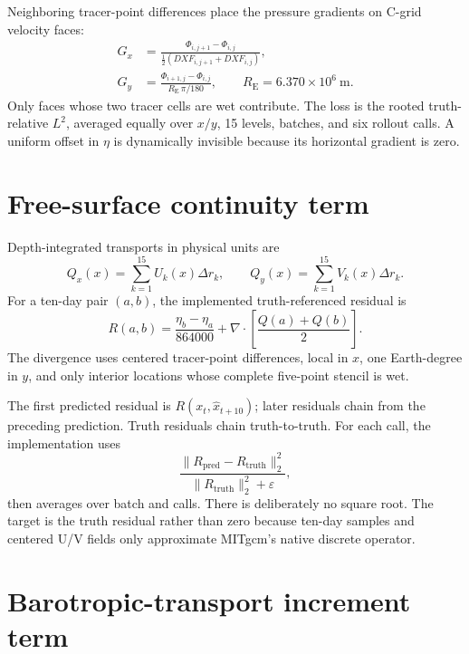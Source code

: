 \documentclass[11pt,oneside]{report}
\newcommand{\code}[1]{\texttt{\detokenize{#1}}}
\newcommand{\Ltwo}{L^2}
\newcommand{\eps}{\varepsilon}
\begin{document}
Neighboring tracer-point differences place the pressure gradients on C-grid
velocity faces:
\begin{align}
  G_x &= \frac{\Phi_{i,j+1}-\Phi_{i,j}}
              {\tfrac12(DXF_{i,j+1}+DXF_{i,j})},\\
  G_y &= \frac{\Phi_{i+1,j}-\Phi_{i,j}}
              {R_{\mathrm E}\,\pi/180},
  \qquad R_{\mathrm E}=6.370\times10^6\ \mathrm m.
\end{align}
Only faces whose two tracer cells are wet contribute. The loss is the rooted
truth-relative \(\Ltwo\), averaged equally over \(x/y\), 15 levels, batches, and
six rollout calls. A uniform offset in \(\eta\) is dynamically invisible
because its horizontal gradient is zero.

\section{Free-surface continuity term}

Depth-integrated transports in physical units are
\begin{equation}
  Q_x(x)=\sum_{k=1}^{15}U_k(x)\Delta r_k,
  \qquad
  Q_y(x)=\sum_{k=1}^{15}V_k(x)\Delta r_k.
\end{equation}
For a ten-day pair \((a,b)\), the implemented truth-referenced residual is
\begin{equation}
  R(a,b)
  =
  \frac{\eta_b-\eta_a}{864000}
  +
  \nabla\cdot
  \left[\frac{Q(a)+Q(b)}{2}\right].
\end{equation}
The divergence uses centered tracer-point differences, local \code{DXF} in
\(x\), one Earth-degree in \(y\), and only interior locations whose complete
five-point stencil is wet.

The first predicted residual is \(R(x_t,\widehat{x}_{t+10})\); later residuals
chain from the preceding prediction. Truth residuals chain truth-to-truth.
For each call, the implementation uses
\begin{equation}
  \frac{\|R_{\mathrm{pred}}-R_{\mathrm{truth}}\|_2^2}
       {\|R_{\mathrm{truth}}\|_2^2+\eps},
\end{equation}
then averages over batch and calls. There is deliberately no square root.
The target is the truth residual rather than zero because ten-day samples and
centered U/V fields only approximate MITgcm's native discrete operator.

\section{Barotropic-transport increment term}
\end{document}
